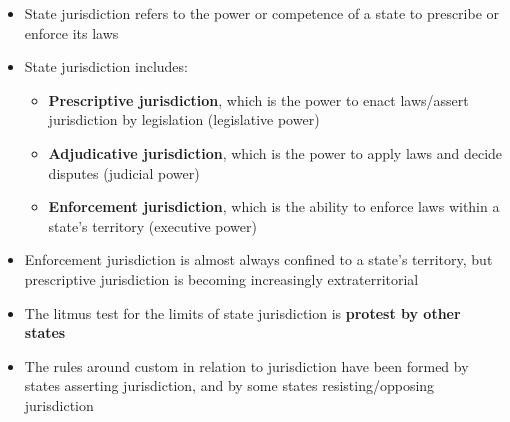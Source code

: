 \begin{itemize}
    \item State jurisdiction refers to the power or competence of a state to prescribe or enforce its laws
    \item State jurisdiction includes:
    \begin{itemize}
        \item \textbf{Prescriptive jurisdiction}, which is the power to enact laws/assert jurisdiction by legislation (legislative power)
        \item \textbf{Adjudicative jurisdiction}, which is the power to apply laws and decide disputes (judicial power)
        \item \textbf{Enforcement jurisdiction}, which is the ability to enforce laws within a state's territory (executive power)
    \end{itemize}
    \item Enforcement jurisdiction is almost always confined to a state's territory, but prescriptive jurisdiction is becoming increasingly extraterritorial
    \item The litmus test for the limits of state jurisdiction is \textbf{protest by other states}
    \item The rules around custom in relation to jurisdiction have been formed by states asserting jurisdiction, and by some states resisting/opposing jurisdiction
\end{itemize}

